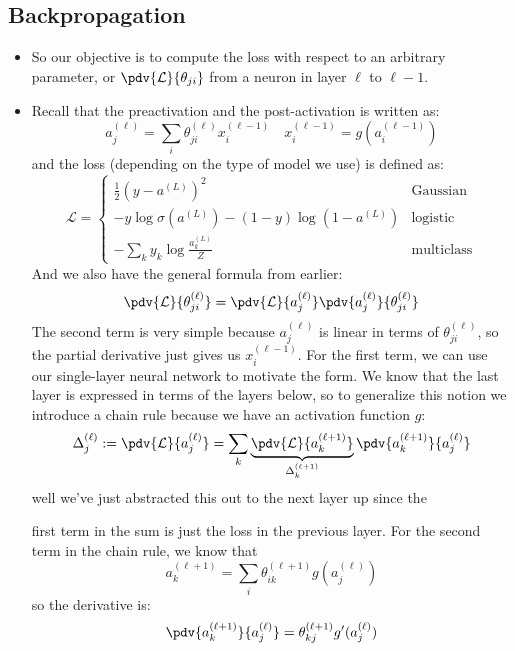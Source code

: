 \subsection{Backpropagation}
\begin{itemize}
	\item So our objective is to compute the loss with respect to an arbitrary
		parameter, or \( \pdv{\mathcal{L}}{\theta_{ji}} \) from a neuron in layer \(
		\ell \) to \( \ell - 1 \). 
	\item Recall that the preactivation and the post-activation is written as:
		\[
			a_{j}^{(\ell)} = \sum_i \theta_{ji}^{(\ell)} x_i^{(\ell - 1)} \quad 
			 x_i^{(\ell - 1)} = g(a_i^{(\ell - 1)}) 
		\]
		and the loss (depending on the type of model we use) is defined as:
		\[
			\mathcal{L} = \begin{cases}
				\frac{1}{2}( y - a^{(L)})^2 & \text{Gaussian}\\
				- y \log \sigma(a^{(L)}) - (1 - y) \log(1 - a^{(L)}) &\text{logistic}\\ 
				-\sum_k y_k \log \frac{a_k^{(L)}}{Z} & \text{multiclass}
			\end{cases}
		\]
		And we also have the general formula from earlier:
		\[
			\pdv{\mathcal{L}}{\theta_{ji}^{(\ell)}} = \pdv{\mathcal{L}}{a_j^{(\ell)}}
			\pdv{a_j^{(\ell)}}{\theta_{ji}^{(\ell)}}
		\]
		The second term is very simple because \( a_j^{(\ell)} \) is linear in terms
		of \( \theta_{ji}^{(\ell)} \), so the partial derivative just gives us \(
		x_i^{(\ell - 1)} \). For the first term, we can use our single-layer neural
		network to motivate the form. We know that the last layer is expressed in
		terms of the layers below, so to generalize this notion we introduce a chain
		rule because we have an activation function \( g \): 
		\[
			\Delta_j^{(\ell)} := \pdv{\mathcal{L}}{a_j^{(\ell)}} = \sum_k
			\underbrace{\pdv{\mathcal{L}}{a_k^{(\ell + 1)}}}_{\Delta_k^{(\ell + 1)}}
			\pdv{a_k^{(\ell + 1)}}{a_j^{(\ell)}}
		\]
		well we've just abstracted this out to the next layer up since the
		
		first term in the sum is just the loss in the previous layer. For the second
		term in the chain rule, we know that
		\[
			a_{k}^{(\ell + 1)} = \sum_i \theta_{ik}^{(\ell+1)} g(a_j^{(\ell)})
		\]
		so the derivative is:
		\[
			\pdv{a_k^{(\ell + 1)}}{a_j^{(\ell)}} = \theta_{kj}^{(\ell + 1)}
				g'(a_j^{(\ell)})
		\]



\end{itemize}
